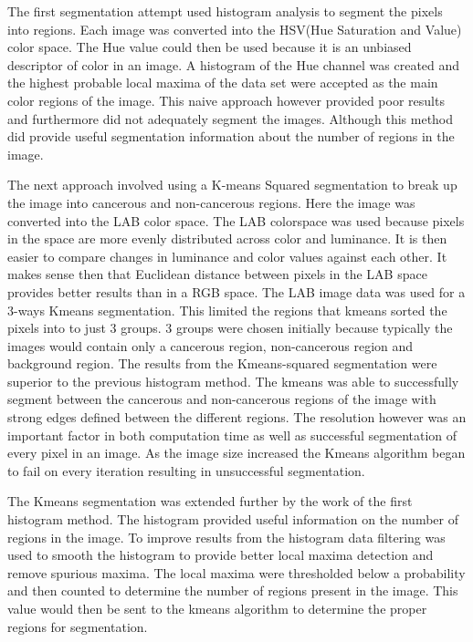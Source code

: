 \documentclass[a4paper,10pt,oneside]{article}
\begin{document}
The first segmentation attempt used histogram analysis to segment the pixels into regions. Each image was converted into the HSV(Hue Saturation and Value) color space. The Hue value could then be used because it is an unbiased descriptor of color in an image. A histogram of the Hue channel was created and the highest probable local maxima of the data set were accepted as the main color regions of the image. This naive approach however provided poor results and furthermore did not adequately segment the images. Although this method did provide useful segmentation information about the number of regions in the image.

The next approach involved using a K-means Squared segmentation to break up the image into cancerous and non-cancerous regions. Here the image was converted into the LAB color space. The LAB colorspace was used because pixels in the space are more evenly distributed across color and luminance. It is then easier to compare changes in luminance and color values against each other. It makes sense then that Euclidean distance between pixels in the LAB space provides better results than in a RGB space. The LAB image data was used for a 3-ways Kmeans segmentation. This limited the regions that kmeans sorted the pixels into to just 3 groups. 3 groups were chosen initially because typically the images would contain only a cancerous region, non-cancerous region and background region. The results from the Kmeans-squared segmentation were superior to the previous histogram method. The kmeans was able to successfully segment between the cancerous and non-cancerous regions of the image with strong edges defined between the different regions. The resolution however was an important factor in both computation time as well as successful segmentation of every pixel in an image. As the image size increased the Kmeans algorithm began to fail on every iteration resulting in unsuccessful segmentation.


The Kmeans segmentation was extended further by the work of the first histogram method. The histogram provided useful information on the number of regions in the image. To improve results from the histogram data filtering was used to smooth the histogram to provide better local maxima detection and remove spurious maxima. The local maxima were thresholded below a probability and then counted to determine the number of regions present in the image. This value would then be sent to the kmeans algorithm to determine the proper regions for segmentation.
\end{document}
